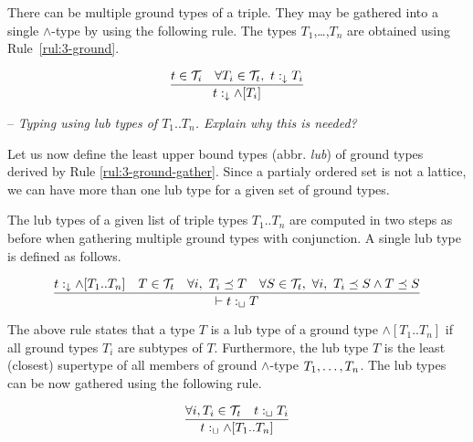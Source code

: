 \documentclass[runningheads]{llncs}
\newcommand{\darr}{\downarrow}
\newcommand{\T}{{\cal T}}
\newcommand{\Tt}{{\cal T}_t}
\newcommand{\memo}[1]{}
\newcommand{\notes}[1]{\noindent\begin{small}-- \emph{#1}\\\end{small}}
\begin{document}
There can be multiple ground types of a triple. They may be gathered
into a single $\land$-type by using the following rule. The types
$T_1$,\ldots,$T_n$ are obtained using Rule~\ref{rul:3-ground}.

\begin{equation}
\label{rul:3-ground-gather}
\dfrac{t\in \T_i\quad \forall\/T_i\in\T_t,\ t:_\darr\/T_i}
      {t:_\darr\land[T_i]}
\end{equation}


\notes{Typing using lub types of $T_1..T_n$. Explain why this is needed?}

Let us now define the least upper bound types (abbr. \emph{lub}) of
ground types derived by Rule \ref{rul:3-ground-gather}. Since a
partialy ordered set is not a lattice, we can have more than one lub
type for a given set of ground types.

The lub types of a given list of triple types $T_1..T_n$ are
computed in two steps as before when gathering multiple ground types
with conjunction. A single lub type is defined as follows.

\begin{equation}
\dfrac{t:_\darr\land[T_1..T_n]\quad T\in\Tt\quad \forall\/i,\ T_i\preceq\/T\quad \forall\/S\in\T_t,\ \forall\/i,\ T_i\preceq\/S\land\/T\preceq\/S}
      {\vdash\/t:_\sqcup\/T}
\end{equation}

The above rule states that a type $T$ is a lub type of a ground type 
$\land[T_1..T_n]$ if all ground types $T_i$ are subtypes of
$T$. Furthermore, the lub type $T$ is the least (closest) supertype of
all members of ground $\land$-type $T_1,\ldots\/,T_n$. The lub types
can be now gathered using the following rule.

\begin{equation}
\dfrac{\forall i, T_i\in\Tt\quad t:_\sqcup\/T_i}
      {t:_\sqcup\land[T_1..T_n]}
\end{equation}


\memo{The types of $s$ and $o$ can be any classes $T_s$ and $T_o$ from
  ${\cal I}_c$, while the type of $p$ has to be a class $T_p$ that is
  a subclass of rdf:Property. The typing of a triple $t$ is correct
  since the interpretation of $T$ includes $t$.}

\memo{Moreover, the types $T$ that are derived by the above rule are
  minimal in the sense that given the information provided, i.e., the
  types of $t$'s components, their interpretations are minimal
  possible comparing them to the interpretations of all other derived
  types of $t$.}
\end{document}
